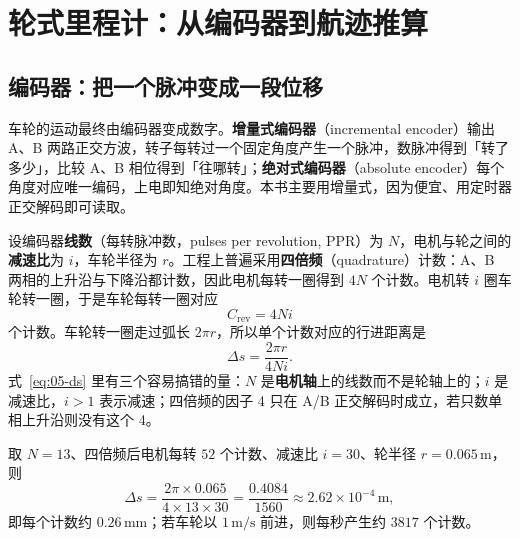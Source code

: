 ﻿\chapter{轮式里程计：从编码器到航迹推算}\label{ch:05-wheel}


\section{编码器：把一个脉冲变成一段位移}\label{sec:05-encoder}

车轮的运动最终由编码器变成数字。\textbf{增量式编码器}（incremental encoder）输出 A、B 两路正交方波，转子每转过一个固定角度产生一个脉冲，数脉冲得到「转了多少」，比较 A、B 相位得到「往哪转」；\textbf{绝对式编码器}（absolute encoder）每个角度对应唯一编码，上电即知绝对角度。本书主要用增量式，因为便宜、用定时器正交解码即可读取。

设编码器\textbf{线数}（每转脉冲数，pulses per revolution, PPR）为 $N$，电机与轮之间的\textbf{减速比}为 $i$，车轮半径为 $r$。工程上普遍采用\textbf{四倍频}（quadrature）计数：A、B 两相的上升沿与下降沿都计数，因此电机每转一圈得到 $4N$ 个计数。电机转 $i$ 圈车轮转一圈，于是车轮每转一圈对应
\begin{equation}
  C_{\text{rev}} = 4Ni
  \label{eq:05-counts-rev}
\end{equation}
个计数。车轮转一圈走过弧长 $2\pi r$，所以单个计数对应的行进距离是
\begin{equation}
  \Delta s = \frac{2\pi r}{4Ni}.
  \label{eq:05-ds}
\end{equation}
式~\eqref{eq:05-ds} 里有三个容易搞错的量：$N$ 是\textbf{电机轴}上的线数而不是轮轴上的；$i$ 是减速比，$i>1$ 表示减速；四倍频的因子 4 只在 A/B 正交解码时成立，若只数单相上升沿则没有这个 4。

\begin{example}[一个计数有多长]
取 $N=13$、四倍频后电机每转 $52$ 个计数、减速比 $i=30$、轮半径 $r=0.065\,\mathrm{m}$，则
\begin{equation}
  \Delta s=\frac{2\pi\times0.065}{4\times13\times30}
  =\frac{0.4084}{1560}\approx2.62\times10^{-4}\,\mathrm{m},
\end{equation}
即每个计数约 $0.26\,\mathrm{mm}$；若车轮以 $1\,\mathrm{m/s}$ 前进，则每秒产生约 $3817$ 个计数。
\end{example}

